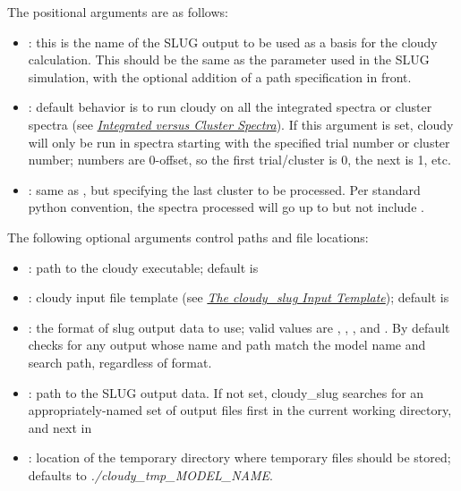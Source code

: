 \documentclass[letterpaper,10pt,english]{sphinxmanual}
\begin{document}
The positional arguments are as follows:
\begin{itemize}
\item {} 
: this is the name of the SLUG output to be used
as a basis for the cloudy calculation. This should be the same as
the  parameter used in the SLUG simulation, with the
optional addition of a path specification in front.

\item {} 
: default behavior is to run cloudy on all the
integrated spectra or cluster spectra (see
{\hyperref[cloudy:sssec\string-cloudy\string-integrated\string-cluster]{\emph{Integrated versus Cluster Spectra}}}). If this
argument is set, cloudy will only be run in spectra starting with
the specified trial number or cluster number; numbers are
0-offset, so the first trial/cluster is 0, the next is 1, etc.

\item {} 
: same as , but specifying the last
cluster to be processed. Per standard python convention, the spectra
processed will go up to but not include .

\end{itemize}

The following optional arguments control paths and file locations:
\begin{itemize}
\item {} 
: path to the cloudy executable; default
is 

\item {} 
: cloudy input file template (see
{\hyperref[cloudy:ssec\string-cloudy\string-template]{\emph{The cloudy\_slug Input Template}}}); default is

\item {} 
: the format of slug output data to use;
valid values are , , , and . By
default  checks for any output whose name and path
match the model name and search path, regardless of format.

\item {} 
: path to the SLUG output data. If not set,
cloudy\_slug searches for an appropriately-named set of output files
first in the current working directory, and next in

\item {} 
: location of the temporary directory
where temporary files should be stored; defaults to
\emph{./cloudy\_tmp\_MODEL\_NAME}.

\end{itemize}
\end{document}

